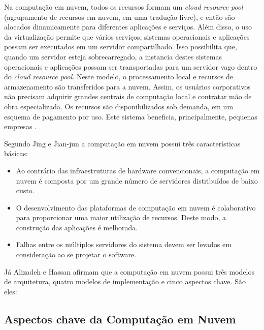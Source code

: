 \documentclass[12pt]{article}
\begin{document}
Na computação em nuvem, todos os recursos formam um \textit{cloud resource pool} (agrupamento
de recursos em nuvem, em uma tradução livre), e então são alocados
dinamicamente para diferentes aplicações e serviços. Além disso, o uso da virtualização
permite que vários serviços,  sistemas operacionais e aplicações possam ser executados
em um servidor compartilhado. Isso possibilita que, quando um servidor esteja sobrecarregado,
a instancia destes sistemas operacionais e aplicações possam ser transportadas para
um servidor vago dentro do \textit{cloud resource pool}. Neste modelo, o
processamento local e recursos de armazenamento são transferidos para a nuvem.
Assim, os usuários corporativos não precisam adquirir grandes centrais de computação
local e contratar mão de obra especializada. Os recursos são disponibilizados sob
demanda, em um esquema de pagamento por uso. Este sistema beneficia, principalmente,
pequenas empresas \cite{jing2010}.

Segundo Jing e Jian-jun \cite{jing2010} a computação em nuvem possui três
características básicas:

\begin{itemize}
  \item Ao contrário das infraestruturas de hardware convencionais, a computação
  em nuvem é composta por um grande número de servidores distribuídos de baixo
  custo.
  \item O desenvolvimento das plataformas de computação em nuvem é colaborativo
  para proporcionar uma maior utilização de recursos. Deste modo, a construção
  das aplicações é melhorada.
  \item Falhas entre os múltiplos servidores do sistema devem ser levados em
  consideração ao se projetar o software.
\end{itemize}

Já Alizadeh e Hassan \cite{alizadeh2013} afirmam que a computação em nuvem possui três
modelos de arquitetura, quatro modelos de implementação e cinco aspectos chave. São eles:

\subsection{Aspectos chave da Computação em Nuvem}
\end{document}
